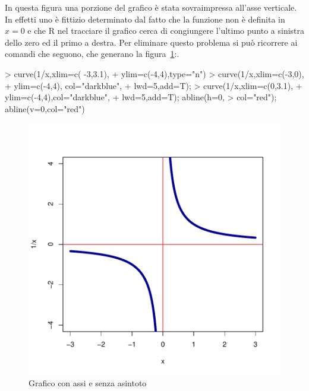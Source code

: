 \documentclass[onecolumn,11pt]{book}
\begin{document}
\begin{itemize}
In questa figura una porzione del grafico \`e stata sovraimpressa all'asse verticale.  In effetti uno \`e fittizio determinato dal fatto che la funzione non \`e definita in $x=0$ e che \textsf{R} nel tracciare il grafico cerca di congiungere l'ultimo punto a sinistra dello zero ed il primo a destra. Per eliminare questo problema si pu\`o ricorrere ai comandi che seguono, che generano la figura~\ref{fig:noasint}:.
\begin{Schunk}
\begin{Sinput}
>  curve(1/x,xlim=c( -3,3.1),
+  ylim=c(-4,4),type="n")
>  curve(1/x,xlim=c(-3,0), 
+ ylim=c(-4,4), col="darkblue",
+ lwd=5,add=T); 
>  curve(1/x,xlim=c(0,3.1), 
+  ylim=c(-4,4),col="darkblue",
+  lwd=5,add=T); abline(h=0,
> col="red"); abline(v=0,col="red")
\end{Sinput}
\end{Schunk}
\begin{figure}[ htbp]
\begin{center}
\includegraphics{statisticaconR-078}
\caption{Grafico con assi e senza asintoto}
\label{fig:noasint}
\end{center}
\end{figure}
\end{itemize}
\end{document}
